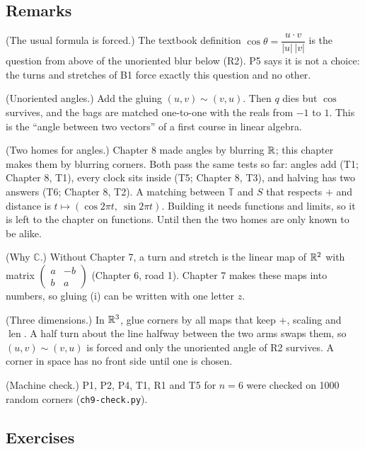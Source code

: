 \subsection*{Remarks}

\begin{lines}
\item[\lab{R1}] (The usual formula is forced.) The textbook definition $\cos\theta = \dfrac{u \cdot v}{|u|\,|v|}$ is the question from above of the unoriented blur below (R2). P5 says it is not a choice: the turns and stretches of B1 force exactly this question and no other.
\item[\lab{R2}] (Unoriented angles.) Add the gluing $(u, v) \sim (v, u)$. Then $q$ dies but $\cos$ survives, and the bags are matched one-to-one with the reals from $-1$ to $1$. This is the ``angle between two vectors'' of a first course in linear algebra.
\item[\lab{R3}] (Two homes for angles.) Chapter 8 made angles by blurring $\mathbb{R}$; this chapter makes them by blurring corners. Both pass the same tests so far: angles add (T1; Chapter 8, T1), every clock sits inside (T5; Chapter 8, T3), and halving has two answers (T6; Chapter 8, T2). A matching between $\mathbb{T}$ and $S$ that respects $+$ and distance is $t \mapsto (\cos 2\pi t,\ \sin 2\pi t)$. Building it needs functions and limits, so it is left to the chapter on functions. Until then the two homes are only known to be alike.
\item[\lab{R4}] (Why $\mathbb{C}$.) Without Chapter 7, a turn and stretch is the linear map of $\mathbb{R}^2$ with matrix $\begin{pmatrix} a & -b \\ b & a \end{pmatrix}$ (Chapter 6, road 1). Chapter 7 makes these maps into numbers, so gluing (i) can be written with one letter $z$.
\item[\lab{R5}] (Three dimensions.) In $\mathbb{R}^3$, glue corners by all maps that keep $+$, scaling and $\operatorname{len}$. A half turn about the line halfway between the two arms swaps them, so $(u,v) \sim (v,u)$ is forced and only the unoriented angle of R2 survives. A corner in space has no front side until one is chosen.
\item[\lab{R6}] (Machine check.) P1, P2, P4, T1, R1 and T5 for $n = 6$ were checked on 1000 random corners (\texttt{ch9-check.py}).
\end{lines}

\subsection*{Exercises}

